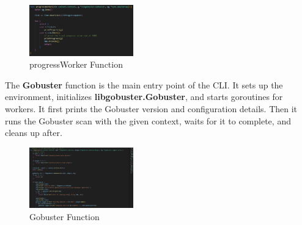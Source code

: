\documentclass[12 pt]{article}
\begin{document}
\begin{figure}[H]
    \centering
    \includegraphics[width=0.4\textwidth]{progressWorker.png}
    \caption{progressWorker Function}
    \label{fig: progressWorker}
\end{figure}
The \textbf{Gobuster} function is the main entry point of the CLI. It sets up the environment, initializes \textbf{libgobuster.Gobuster}, and starts goroutines for workers. It first prints the Gobuster version and configuration details. Then it runs the Gobuster scan with the given context, waits for it to complete, and cleans up after.
\begin{figure}[H]
    \centering
    \includegraphics[width=0.4\textwidth]{Gobuster_cli.png}
    \caption{Gobuster Function}
    \label{fig: Gobuster cli}
\end{figure}
\end{document}
